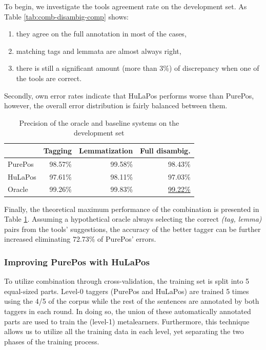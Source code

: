To begin, we investigate the tools agreement rate on the development set.
As Table \ref{tab:comb-disambig-comp} shows:
\begin{enumerate}
 \item they agree on the full annotation in most of the cases,
 \item matching tags and lemmata are almost always right,
 \item there is still a significant amount (more than 3\%) of discrepancy when one of the tools are correct.
\end{enumerate}

Secondly, own error rates indicate that HuLaPos performs worse than PurePos, however, the overall error distribution is fairly balanced between them. 

\begin{table}[h]
\centering
\caption{Precision of the oracle and baseline systems on the development set}\label{tab:comb-disambig-acc}
\begin{tabular}{l r r r}
\hline
& Tagging & Lemmatization & Full disambig. \\
\hline
PurePos & 98.57\% & 99.58\% & 98.43\% \\
HuLaPos & 97.61\% & 98.11\% & 97.03\% \\
Oracle & 99.26\% & 99.83\% & \underline{99.22\%} \\
\hline
\end{tabular}
\end{table}

Finally, the theoretical maximum performance of the combination is presented in Table \ref{tab:comb-disambig-acc}.
Assuming a hypothetical oracle always selecting the correct \emph{(tag, lemma)} pairs from the tools' suggestions, the accuracy of the better tagger can be further increased eliminating 72.73\% of PurePos' errors. 

\subsubsection{Improving PurePos with HuLaPos}

To utilize combination through cross-validation, the training set is split into 5 equal-sized parts.
Level-0 taggers (PurePos and HuLaPos) are trained 5 times using the 4/5 of the corpus while the rest of the sentences are annotated by both taggers in each round.
In doing so, the union of these automatically annotated parts are used to train the (level-1) metalearners.
Furthermore, this technique allows us to utilize all the training data in each level, yet separating the two phases of the training process. 

